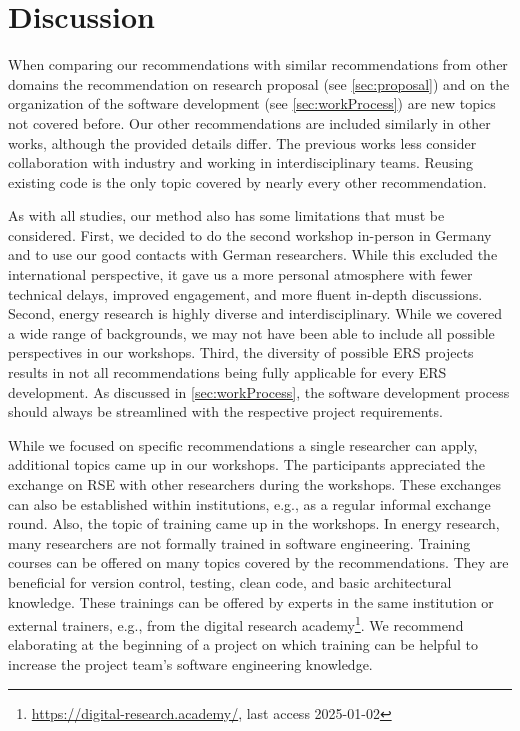 \section{Discussion}
\label{sec:dis}

When comparing our recommendations with similar recommendations from other domains \cite{list2017ten,osborne_ten_2014,taschuk2017ten,balaban2021ten,prlic_ten_2012,hunter2021ten,wilson_best_2014, jimenez_four_2017} the recommendation on research proposal (see \ref{sec:proposal}) and on the organization of the software development (see \ref{sec:workProcess}) are new topics not covered before. Our other recommendations are included similarly in other works, although the provided details differ. The previous works less consider collaboration with industry and working in interdisciplinary teams. Reusing existing code is the only topic covered by nearly every other recommendation.

As with all studies, our method also has some limitations that must be considered. 
First, we decided to do the second workshop in-person in Germany and to use our good contacts with German researchers. While this excluded the international perspective, it gave us a more personal atmosphere with fewer technical delays, improved engagement, and more fluent in-depth discussions.
Second, energy research is highly diverse and interdisciplinary. While we covered a wide range of backgrounds, we may not have been able to include all possible perspectives in our workshops. 
Third, the diversity of possible \ac{ERS} projects results in not all recommendations being fully applicable for every \ac{ERS} development. As discussed in \ref{sec:workProcess}, the software development process should always be streamlined with the respective project requirements. 

While we focused on specific recommendations a single researcher can apply, additional topics came up in our workshops. 
The participants appreciated the exchange on \ac{RSE} with other researchers during the workshops. These exchanges can also be established within institutions, e.g., as a regular informal exchange round. 
Also, the topic of training came up in the workshops. In energy research, many researchers are not formally trained in software engineering. Training courses can be offered on many topics covered by the recommendations. 
They are beneficial for version control, testing, clean code, and basic architectural knowledge.
These trainings can be offered by experts in the same institution or external trainers, e.g., from the digital research academy\footnote{\url{https://digital-research.academy/}, last access 2025-01-02}.
We recommend elaborating at the beginning of a project on which training can be helpful to increase the project team's software engineering knowledge.